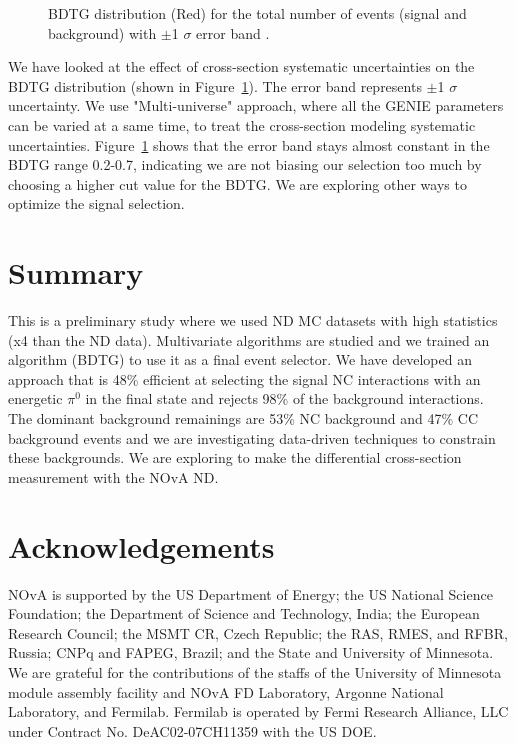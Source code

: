 \documentclass[12pt]{article}
\begin{document}
 \begin{figure}[H]
\begin{center}
\caption{BDTG distribution (Red) for the total number of events (signal and background) with $\pm$1 $\sigma$ error band .}
\label{fig:systematic}
\end{center}
\end{figure} 

We have looked at the effect of cross-section systematic uncertainties on the BDTG distribution (shown in Figure~\ref{fig:systematic}). The error band represents $\pm$1 $\sigma$ uncertainty. We use "Multi-universe" approach, where all the GENIE parameters can be varied at a same time, to treat the cross-section modeling systematic uncertainties. Figure~\ref{fig:systematic} shows that the error band stays almost constant in the BDTG range 0.2-0.7, indicating we are not biasing our selection too much by choosing a higher cut value for the BDTG. We are exploring other ways to optimize the signal selection.


\section{Summary}

This is a preliminary study where we used ND MC datasets with high statistics (x4 than the ND data). Multivariate algorithms are studied and we trained an algorithm (BDTG) to use it as a final event selector. We have developed an approach that is 48\% efficient at selecting the signal NC interactions with an energetic $\pi^{0}$ in the final state and rejects 98\% of the background interactions. The dominant background remainings are 53\% NC background and 47\% CC background events and we are investigating data-driven techniques to constrain these backgrounds. We are exploring to make the differential cross-section measurement with the NOvA ND.

\section{Acknowledgements}

NOvA is supported by the US Department of Energy; the US National Science Foundation; the Department of Science and Technology, India; the European Research Council; the MSMT CR, Czech Republic; the RAS, RMES, and RFBR, Russia; CNPq and FAPEG, Brazil; and the State and University of Minnesota.  We are grateful for the contributions of the staffs of the University of Minnesota module assembly facility and NOvA FD Laboratory, Argonne National Laboratory, and Fermilab. Fermilab is operated by Fermi Research Alliance, LLC under Contract No. DeAC02-07CH11359 with the US DOE.
\end{document}

